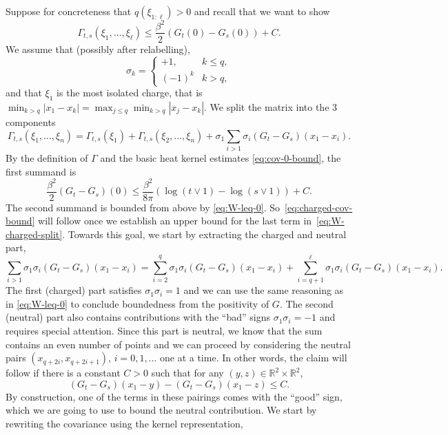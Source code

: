 \documentclass[11pt, a4paper]{scrartcl}
\numberwithin{equation}{section}
\theoremstyle{plain}
\theoremstyle{remark}
\begin{document}
Suppose for concreteness that $q (\xi_{1 : \ell}) > 0$ and recall that we want
to show
\[ \Gamma_{t, s} (\xi_1, \ldots, \xi_{\ell}) \leqslant \frac{\beta^2}{2} (G_t
	(0) - G_s (0)) + C. \]
We assume that (possibly after relabelling),
\[ \sigma_k = \begin{cases}
		+ 1,    & k \leqslant q, \\
		(- 1)^k & k > q,
	\end{cases} \]
and that \(\xi_1\) is the most isolated charge, that is \(\min_{k>q}|x_1-x_k| = \max_{j\leqslant q}\min_{k>q} |x_j - x_k|\). 
We split the matrix into the 3 components
\begin{equation}
	\Gamma_{t, s} (\xi_1, \ldots, \xi_n) = \Gamma_{t, s} (\xi_1) + \Gamma_{t, s} (\xi_2,
	\ldots, \xi_n) + \sigma_1  \sum_{i > 1} \sigma_i (G_t - G_s) (x_1 - x_i) .
	\label{eq:W-charged-split}
\end{equation}
By the definition of $\Gamma$ and the basic heat kernel estimates
\eqref{eq:cov-0-bound}, the first summand is
\[ \frac{\beta^2}{2} (G_t - G_s) (0) \leqslant \frac{\beta^2}{8 \pi} (\log (t \vee
	1) - \log (s \vee 1)) + C. \]
The second summand is bounded from above by \eqref{eq:W-leq-0}.
So~\eqref{eq:charged-cov-bound} will follow once we establish an upper bound
for the last term in~\eqref{eq:W-charged-split}. Towards this goal, we start
by extracting the charged and neutral part,
\[ \sum_{i > 1} \sigma_1 \sigma_i (G_t - G_s) (x_1 - x_i) = \sum_{i = 2}^q
	\sigma_1 \sigma_i (G_t - G_s) (x_1 - x_i) + \sum_{i = q + 1}^{\ell}
	\sigma_1 \sigma_i (G_t - G_s) (x_1 - x_i) . \]
The first (charged) part satisfies $\sigma_1 \sigma_i = 1$ and we can use the
same reasoning as in \eqref{eq:W-leq-0} to conclude boundedness from the
positivity of $G$. The second (neutral) part also contains contributions with
the ``bad'' signs $\sigma_1 \sigma_i = - 1$ and requires special attention.
Since this part is neutral, we know that the sum contains an even number of
points and we can proceed by considering the neutral pairs $(x_{q + 2 i}, x_{q
			+ 2 i + 1})$, $i = 0, 1, \ldots$ one at a time. In other words, the claim will
follow if there is a constant $C > 0$ such that for any $(y, z) \in
	\mathbb{R}^2 \times \mathbb{R}^2$,
\begin{equation}
	(G_t - G_s) (x_1 - y) - (G_t - G_s) (x_1 - z) \leqslant C.
	\label{eq:3pt-bound}
\end{equation}
By construction, one of the terms in these pairings comes with the ``good''
sign, which we are going to use to bound the neutral contribution. We start by
rewriting the covariance using the kernel representation,
\end{document}
